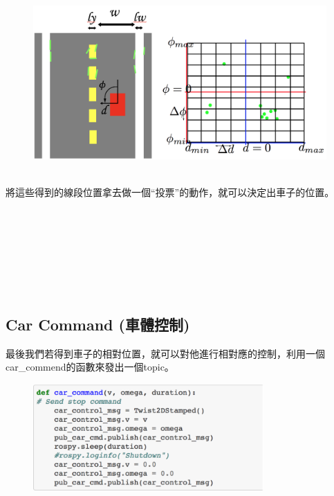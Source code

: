 \documentclass{article}
\begin{document}
\begin{figure}[htp]
    \begin{center}
        \includegraphics[width=400pt]{pic/3_3_2.png}
    \end{center}
\end{figure}
\\
將這些得到的線段位置拿去做一個“投票”的動作，就可以決定出車子的位置。
\\\\\\\\\\\\\\\\
\subsection{Car Command (車體控制)}
最後我們若得到車子的相對位置，就可以對他進行相對應的控制，利用一個car\_commend的函數來發出一個topic。
\begin{figure}[htp]
    \begin{center}
        \includegraphics[width=250pt]{pic/3_3_6.png}
    \end{center}
\end{figure}
\end{document}
